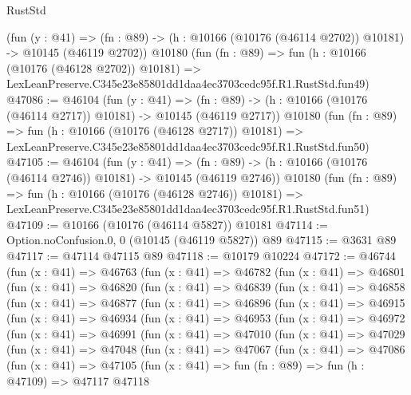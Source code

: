 \begin{lexlean}{RustStd}
\begin{coremodule}
    (fun (y : @41) =>
    (fn : @89) -> (h : @10166 (@10176 (@46114 @2702)) @10181) -> @10145 (@46119 @2702))
    @10180
    (fun (fn : @89) =>
    fun (h : @10166 (@10176 (@46128 @2702)) @10181) =>
    LexLeanPreserve.C345e23e85801dd1daa4ec3703cedc95f.R1.RustStd.fun49)
@47086 := @46104
    (fun (y : @41) =>
    (fn : @89) -> (h : @10166 (@10176 (@46114 @2717)) @10181) -> @10145 (@46119 @2717))
    @10180
    (fun (fn : @89) =>
    fun (h : @10166 (@10176 (@46128 @2717)) @10181) =>
    LexLeanPreserve.C345e23e85801dd1daa4ec3703cedc95f.R1.RustStd.fun50)
@47105 := @46104
    (fun (y : @41) =>
    (fn : @89) -> (h : @10166 (@10176 (@46114 @2746)) @10181) -> @10145 (@46119 @2746))
    @10180
    (fun (fn : @89) =>
    fun (h : @10166 (@10176 (@46128 @2746)) @10181) =>
    LexLeanPreserve.C345e23e85801dd1daa4ec3703cedc95f.R1.RustStd.fun51)
@47109 := @10166 (@10176 (@46114 @5827)) @10181
@47114 := Option.noConfusion.{0, 0} (@10145 (@46119 @5827)) @89
@47115 := @3631 @89
@47117 := @47114 @47115 @89
@47118 := @10179 @10224
@47172 := @46744
    (fun (x : @41) =>
    @46763
      (fun (x : @41) =>
      @46782
        (fun (x : @41) =>
        @46801
          (fun (x : @41) =>
          @46820
            (fun (x : @41) =>
            @46839
              (fun (x : @41) =>
              @46858
                (fun (x : @41) =>
                @46877
                  (fun (x : @41) =>
                  @46896
                    (fun (x : @41) =>
                    @46915
                      (fun (x : @41) =>
                      @46934
                        (fun (x : @41) =>
                        @46953
                          (fun (x : @41) =>
                          @46972
                            (fun (x : @41) =>
                            @46991
                              (fun (x : @41) =>
                              @47010
                                (fun (x : @41) =>
                                @47029
                                  (fun (x : @41) =>
                                  @47048
                                    (fun (x : @41) =>
                                    @47067
                                      (fun (x : @41) =>
                                      @47086
                                        (fun (x : @41) =>
                                        @47105
                                          (fun (x : @41) =>
                                          fun (fn : @89) =>
                                          fun (h : @47109) =>
                                          @47117
                                            @47118

\end{coremodule}
\end{lexlean}
